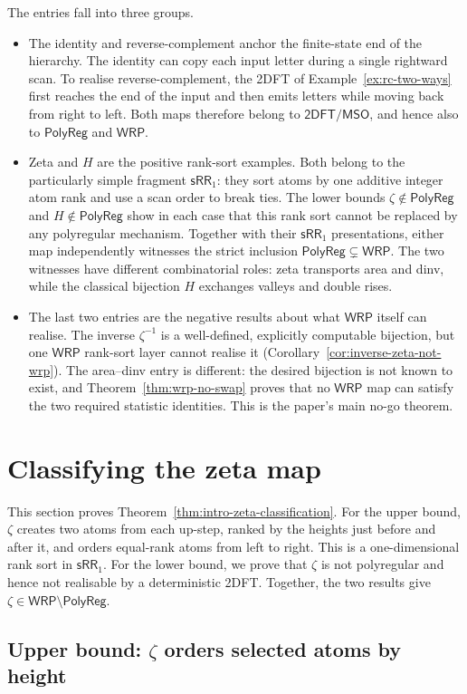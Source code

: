 \documentclass[11pt]{article}
\theoremstyle{definition}
\newcommand{\WRP}{\mathsf{WRP}}
\newcommand{\SWR}{\mathsf{sRR}_1}
\newcommand{\TDFT}{\mathsf{2DFT}}
\newcommand{\MSO}{\mathsf{MSO}}
\newcommand{\polyreg}{\mathsf{PolyReg}}
\begin{document}
The entries fall into three groups.
\begin{itemize}
\item The identity and reverse-complement anchor the finite-state end of the
hierarchy.  The identity can copy each input letter during a single rightward
scan.  To realise reverse-complement, the 2DFT of
Example~\ref{ex:rc-two-ways} first reaches the end of the input and then emits
letters while moving back from right to left.  Both maps therefore belong to
$\TDFT/\MSO$, and hence also to $\polyreg$ and $\WRP$.
\item Zeta and $H$ are the positive rank-sort examples.  Both belong to the
particularly simple fragment $\SWR$: they sort atoms by one additive integer
atom rank and use a scan order to break ties.  The lower bounds
$\zeta\notin\polyreg$ and $H\notin\polyreg$ show in each case that this rank
sort cannot be replaced by any polyregular mechanism.  Together with their
$\SWR$ presentations, either map independently witnesses the strict inclusion
$\polyreg\subsetneq\WRP$.  The two witnesses have different combinatorial
roles: zeta transports area and dinv, while the classical bijection $H$
exchanges valleys and double rises.
\item The last two entries are the negative results about what $\WRP$ itself
can realise.  The inverse
$\zeta^{-1}$ is a well-defined, explicitly computable bijection, but one $\WRP$
rank-sort layer cannot realise it
(Corollary~\ref{cor:inverse-zeta-not-wrp}).  The area--dinv entry is different:
the desired bijection is not known to exist, and
Theorem~\ref{thm:wrp-no-swap} proves that no $\WRP$ map can satisfy the two
required statistic identities.  This is the paper's main no-go theorem.
\end{itemize}

\section{Classifying the zeta map}\label{sec:zeta}

This section proves Theorem~\ref{thm:intro-zeta-classification}.  For the upper
bound, $\zeta$ creates two atoms from each up-step, ranked by the heights just
before and after it, and orders equal-rank atoms from left to right.  This is a
one-dimensional rank sort in $\SWR$.  For the lower bound, we prove that
$\zeta$ is not polyregular and hence not realisable by a deterministic 2DFT.
Together, the two results give $\zeta\in\WRP\setminus\polyreg$.

\subsection[Upper bound: zeta orders selected atoms by height]
{Upper bound: $\zeta$ orders selected atoms by height}
\end{document}
